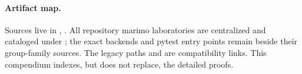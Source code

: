 \documentclass[10pt]{article}
\begin{document}
\paragraph{Artifact map.}
Sources live in ,
.  All repository
marimo laboratories are centralized and cataloged under
; the exact backends and pytest entry points remain
beside their group-family sources. The legacy paths
 and  are compatibility
links. This compendium indexes, but does not replace, the detailed proofs.
\end{document}
